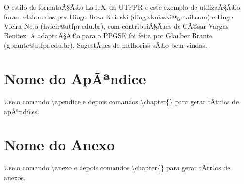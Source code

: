 \documentclass[openright]{normas-utf-tex} %
\begin{document}
O estilo de formataÃ§Ã£o \LaTeX\ da UTFPR e este exemplo de utilizaÃ§Ã£o foram elaborados por Diogo Rosa Kuiaski (diogo.kuiaski@gmail.com) e Hugo Vieira Neto (hvieir@utfpr.edu.br), com contribuiÃ§Ãµes de CÃ©sar Vargas Benitez. A adaptaÃ§Ã£o para o PPGSE foi feita por Glauber Brante (gbrante@utfpr.edu.br). SugestÃµes de melhorias sÃ£o bem-vindas.



\clearpage %
\label{bibstart}
\label{bibend}


\apendice
\chapter{Nome do ApÃªndice}
\label{chap:apendice}

Use o comando {\ttfamily \textbackslash apendice} e depois comandos {\ttfamily \textbackslash chapter\{\}}
para gerar tÃ­tulos de apÃªndices.


\anexo
\chapter{Nome do Anexo}
\label{chap:anexo}

Use o comando {\ttfamily \textbackslash anexo} e depois comandos {\ttfamily \textbackslash chapter\{\}}
para gerar tÃ­tulos de anexos.


%
%
%
%
\end{document}
